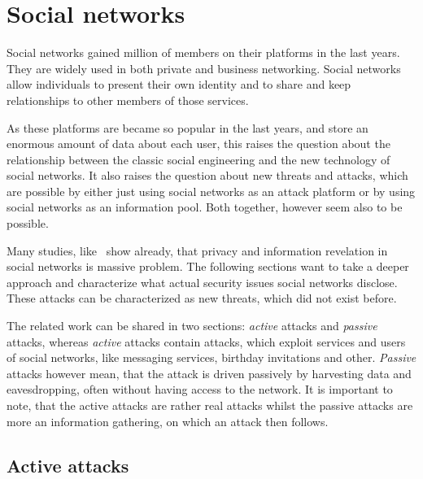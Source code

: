 \section{Social networks}

Social networks gained million of members on their platforms in the last years.
They are widely used in both private and business networking. Social networks
allow individuals to present their own identity and to share and keep
relationships to other members of those services.

As these platforms are became so popular in the last years, and store an
enormous amount of data about each user, this raises the question about the
relationship between the classic social engineering and the new technology of
social networks. It also raises the question about new threats and attacks,
which are possible by either just using social networks as an attack platform
or by using social networks as an information pool. Both together, however seem
also to be possible.

Many studies, like~\cite{fraunhofer2008,gross2005} show already, that privacy
and information revelation in social networks is massive problem. The following
sections want to take a deeper approach and characterize what actual security
issues social networks disclose. These attacks can be characterized as new
threats, which did not exist before. 

The related work can be shared in two sections: \textit{active} attacks and
\textit{passive} attacks, whereas \textit{active} attacks contain attacks,
which exploit services and users of social networks, like messaging services,
birthday invitations and other. \textit{Passive} attacks however mean, that
the attack is driven passively by harvesting data and eavesdropping, often
without having access to the network. It is important to note, that the active
attacks are rather real attacks whilst the passive attacks are more an
information gathering, on which an attack then follows.

\subsection{Active attacks}
\label{subsection:active_attacks}

